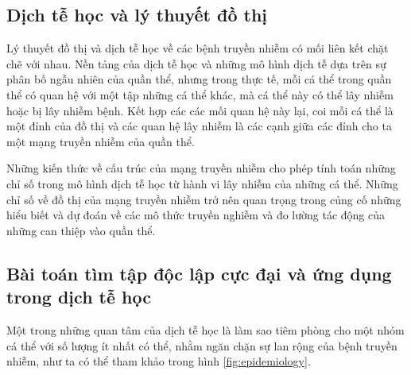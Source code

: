 \documentclass[14pt, oneside, a4paper, openany]{scrartcl}
\begin{document}
\subsection{Dịch tễ học và lý thuyết đồ thị}
Lý thuyết đồ thị và dịch tễ học về các bệnh truyền nhiễm có mối liên kết chặt chẽ với nhau. Nền tảng của dịch tễ học và những mô hình dịch tễ dựa trên sự phân bố ngẫu nhiên của quần thể, nhưng trong thực tế, mỗi cá thể trong quần thể có quan hệ với một tập những cá thể khác, mà cá thể này có thể lây nhiễm hoặc bị lây nhiễm bệnh. Kết hợp các các mối quan hệ này lại, coi mỗi cá thể là một đỉnh của đồ thị và các quan hệ lây nhiễm là các cạnh giữa các đỉnh cho ta một mạng truyền nhiễm của quần thể.

Những kiến thức về cấu trúc của mạng truyền nhiễm cho phép tính toán những chỉ số trong mô hình dịch tễ học từ hành vi lây nhiễm của những cá thể. Những chỉ số về đồ thị của mạng truyền nhiễm trở nên quan trọng trong củng cố những hiểu biết và dự đoán về các mô thức truyền nghiễm và đo lường tác động của những can thiệp vào quần thể.

\subsection{Bài toán tìm tập độc lập cực đại và ứng dụng trong dịch tễ học}

Một trong những quan tâm của dịch tễ học là làm sao tiêm phòng cho một nhóm cá thể với số lượng ít nhất có thể, nhằm ngăn chặn sự lan rộng của bệnh truyền nhiễm, như ta có thể tham khảo trong hình \ref{fig:epidemiology}.
\end{document}
